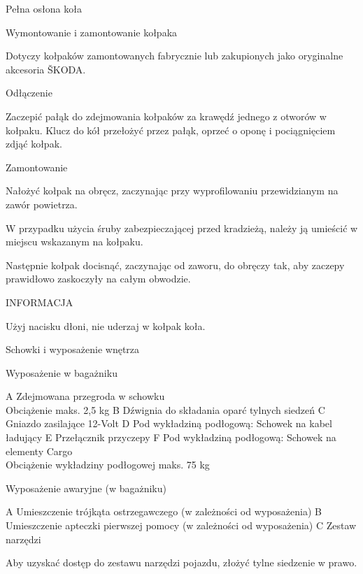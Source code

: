 Pełna osłona koła

Wymontowanie i zamontowanie kołpaka

Dotyczy kołpaków zamontowanych fabrycznie lub zakupionych jako oryginalne akcesoria ŠKODA.

Odłączenie
\begin{itemizeArrow}
	\itemArrow Zaczepić pałąk do zdejmowania kołpaków za krawędź jednego z otworów w kołpaku.
	\itemArrow Klucz do kół przełożyć przez pałąk, oprzeć o oponę i pociągnięciem zdjąć kołpak.
\end{itemizeArrow}

Zamontowanie
\begin{itemizeArrow}
	\itemArrow Nałożyć kołpak na obręcz, zaczynając przy wyprofilowaniu przewidzianym na zawór powietrza.
\end{itemizeArrow}

W przypadku użycia śruby zabezpieczającej przed kradzieżą, należy ją umieścić w miejscu wskazanym na kołpaku.
\begin{itemizeArrow}
	\itemArrow Następnie kołpak docisnąć, zaczynając od zaworu, do obręczy tak, aby zaczepy prawidłowo zaskoczyły na całym obwodzie.
\end{itemizeArrow}

INFORMACJA
\begin{itemizeTriangle}
	\itemTriangle Użyj nacisku dłoni, nie uderzaj w kołpak koła.
\end{itemizeTriangle}

Schowki i wyposażenie wnętrza

Wyposażenie w bagażniku

A Zdejmowana przegroda w schowku \\ Obciążenie maks. 2,5 kg
B Dźwignia do składania oparć tylnych siedzeń
C Gniazdo zasilające 12-Volt
D Pod wykładziną podłogową: Schowek na kabel ładujący
E Przełącznik przyczepy
F Pod wykładziną podłogową: Schowek na elementy Cargo \\ Obciążenie wykładziny podłogowej maks. 75 kg

Wyposażenie awaryjne (w bagażniku)


A Umieszczenie trójkąta ostrzegawczego (w zależności od wyposażenia)
B Umieszczenie apteczki pierwszej pomocy (w zależności od wyposażenia)
C Zestaw narzędzi
\begin{itemizeArrow}
	\itemArrow Aby uzyskać dostęp do zestawu narzędzi pojazdu, złożyć tylne siedzenie w prawo.
\end{itemizeArrow}

